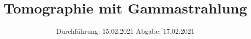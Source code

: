 

\subject{V14}
\title{Tomographie mit Gammastrahlung}
\date{%
  Durchführung: 15.02.2021
  \hspace{3em}
  Abgabe: 17.02.2021
}



\maketitle
\thispagestyle{empty}
\tableofcontents
\newpage






\printbibliography{}


